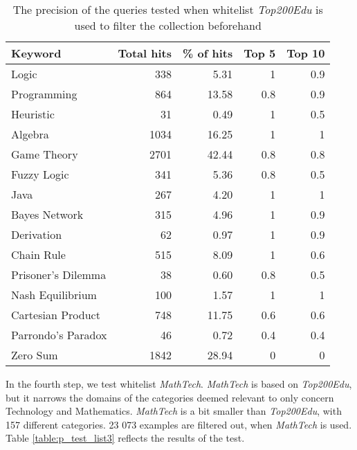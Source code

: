 \begin{table}[h]
\centering
\small
\begin{tabular} {|| p{10em} | r | r | r | r ||} 
 \hline
 Keyword & Total hits & \% of hits & Top 5 & Top 10 \\ [0.5ex] 
 \hline

Logic & 338 & 5.31 & 1 & 0.9 \\
Programming & 864 & 13.58 & 0.8 & 0.9 \\
Heuristic & 31 & 0.49 & 1 & 0.5 \\
Algebra & 1034 & 16.25 & 1 & 1 \\
Game Theory & 2701 & 42.44 & 0.8 & 0.8 \\
\hline
Fuzzy Logic & 341 & 5.36 & 0.8 & 0.5 \\
Java & 267 & 4.20 & 1 & 1 \\
Bayes Network & 315 & 4.96 & 1 & 0.9 \\
Derivation & 62 & 0.97 & 1 & 0.9 \\
\hline
Chain Rule & 515 & 8.09 & 1 & 0.6 \\
Prisoner's Dilemma & 38 & 0.60 & 0.8 & 0.5 \\
Nash Equilibrium & 100 & 1.57 & 1 & 1 \\
Cartesian Product & 748 & 11.75 & 0.6 & 0.6 \\
Parrondo's Paradox & 46 & 0.72 & 0.4 & 0.4 \\
Zero Sum & 1842 & 28.94 & 0 & 0 \\

 \hline
\end{tabular}
\caption{The precision of the queries tested when whitelist \textit{Top200Edu} is used to filter the collection beforehand}
\label{table:p_test_list2}
\end{table}
\clearpage

In the fourth step, we test whitelist \textit{MathTech}. \textit{MathTech} is based on \textit{Top200Edu}, but it narrows the domains of the categories deemed relevant to only concern Technology and Mathematics. \textit{MathTech} is a bit smaller than \textit{Top200Edu}, with 157 different categories. 23 073 examples are filtered out, when \textit{MathTech} is used. Table \ref{table:p_test_list3} reflects the results of the test.


